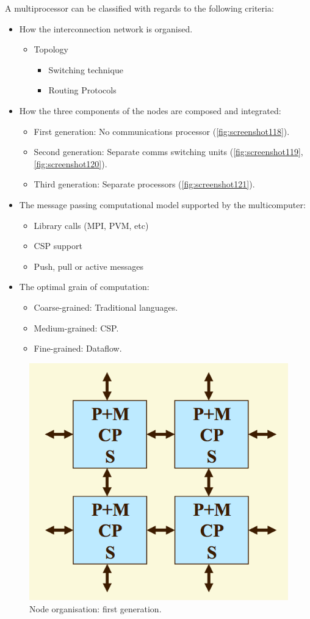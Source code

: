 A multiprocessor can be classified with regards to the following criteria: \begin{itemize}
\item How the interconnection network is organised. \begin{itemize}
	\item Topology \begin{itemize}
		\item Switching technique 
		\item Routing Protocols 
	\end{itemize}
\end{itemize}
\item How the three components of the nodes are composed and integrated: \begin{itemize}
	\item First generation: No communications processor (\autoref{fig:screenshot118}).
	\item Second generation: Separate comms switching units (\autoref{fig:screenshot119}, \autoref{fig:screenshot120}).
	\item Third generation: Separate processors (\autoref{fig:screenshot121}).
\end{itemize}
\item The message passing computational model supported by the multicomputer: \begin{itemize}
	\item Library calls (MPI, PVM, etc) 
	\item CSP support 
	\item Push, pull or active messages 
\end{itemize}
\item The optimal grain of computation: \begin{itemize}
	\item Coarse-grained: Traditional languages.
	\item Medium-grained: CSP.
	\item Fine-grained: Dataflow. 
\end{itemize}
\end{itemize}

\begin{figure}
\centering
\includegraphics[width=0.5\linewidth]{screenshot118}
\caption{Node organisation: first generation.}
\label{fig:screenshot118}
\end{figure}

